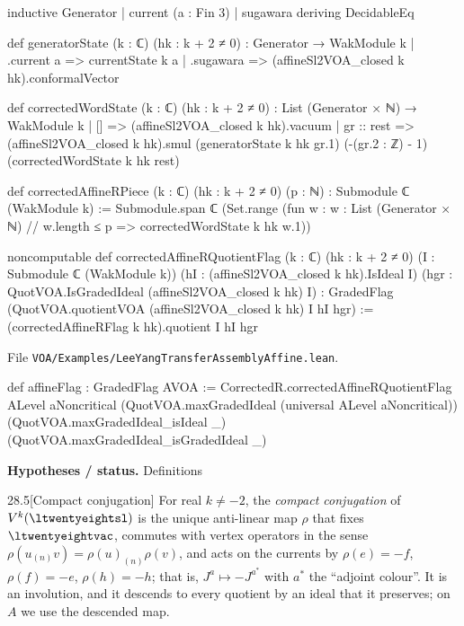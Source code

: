 \documentclass[11pt,openany]{book}
\newcommand{\leanpath}[1]{\texttt{\small #1}}
\theoremstyle{definition}
\theoremstyle{plain}
\begin{document}
\begin{leancode}
inductive Generator
  | current (a : Fin 3)
  | sugawara
  deriving DecidableEq

def generatorState (k : ℂ) (hk : k + 2 ≠ 0) : Generator → WakModule k
  | .current a => currentState k a
  | .sugawara => (affineSl2VOA_closed k hk).conformalVector

def correctedWordState (k : ℂ) (hk : k + 2 ≠ 0) :
    List (Generator × ℕ) → WakModule k
  | [] => (affineSl2VOA_closed k hk).vacuum
  | gr :: rest =>
      (affineSl2VOA_closed k hk).smul (generatorState k hk gr.1)
        (-(gr.2 : ℤ) - 1) (correctedWordState k hk rest)

def correctedAffineRPiece (k : ℂ) (hk : k + 2 ≠ 0) (p : ℕ) :
    Submodule ℂ (WakModule k) :=
  Submodule.span ℂ (Set.range (fun w : {w : List (Generator × ℕ) // w.length ≤ p} =>
    correctedWordState k hk w.1))

noncomputable def correctedAffineRQuotientFlag (k : ℂ) (hk : k + 2 ≠ 0)
    (I : Submodule ℂ (WakModule k))
    (hI : (affineSl2VOA_closed k hk).IsIdeal I)
    (hgr : QuotVOA.IsGradedIdeal (affineSl2VOA_closed k hk) I) :
    GradedFlag (QuotVOA.quotientVOA (affineSl2VOA_closed k hk) I hI hgr) :=
  (correctedAffineRFlag k hk).quotient I hI hgr

\end{leancode}
{\raggedright\noindent File \leanpath{VOA/\allowbreak Examples/\allowbreak LeeYangTransferAssemblyAffine.lean}.\par}
\begin{leancode}
def affineFlag : GradedFlag AVOA :=
  CorrectedR.correctedAffineRQuotientFlag ALevel aNoncritical
    (QuotVOA.maxGradedIdeal (universal ALevel aNoncritical))
    (QuotVOA.maxGradedIdeal_isIdeal _)
    (QuotVOA.maxGradedIdeal_isGradedIdeal _)
\end{leancode}
\noindent\textbf{Hypotheses / status.} Definitions\par
\medskip
\begin{bdefinition}{28.5}[Compact conjugation]
For real $k\ne-2$, the \emph{compact conjugation} of $V^k(\ltwentyeightsl)$ is the unique anti-linear map $\rho$ that fixes
$\ltwentyeightvac$, commutes with vertex operators in the sense $\rho(u_{(n)}v)=\rho(u)_{(n)}\rho(v)$, and acts on the currents by
$\rho(e)=-f$, $\rho(f)=-e$, $\rho(h)=-h$; that is, $J^a\mapsto-J^{a^*}$ with $a^*$ the ``adjoint colour''. It is an involution,
and it descends to every quotient by an ideal that it preserves; on $A$ we use the descended map.
\end{bdefinition}
\end{document}
